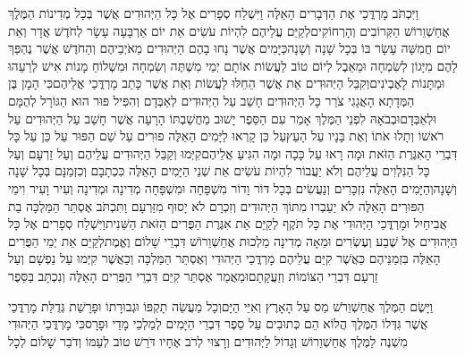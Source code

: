 \documentclass[../main/main.tex]{subfiles}
\begin{document}
\begin{multicols*}{\ncols}
וַיִּכְתֹּב מָרְדֳּכַי אֶת הַדְּבָרִים הָאֵלֶּה וַיִּשְׁלַח סְפָרִים אֶל כָּל הַיְּהוּדִים אֲשֶׁר בְּכָל מְדִינוֹת הַמֶּלֶךְ אֲחַשְׁוֵרוֹשׁ הַקְּרוֹבִים וְהָרְחוֹקִים\PreVerseSpace{}לְקַיֵּם עֲלֵיהֶם לִהְיוֹת עֹשִׂים אֵת יוֹם אַרְבָּעָה עָשָׂר לְחֹדֶשׁ אֲדָר וְאֵת יוֹם חֲמִשָּׁה עָשָׂר בּוֹ בְּכָל שָׁנָה וְשָׁנָה\PreVerseSpace{}כַּיָּמִים אֲשֶׁר נָחוּ בָהֶם הַיְּהוּדִים מֵאֹיְבֵיהֶם וְהַחֹדֶשׁ אֲשֶׁר נֶהְפַּךְ לָהֶם מִיָּגוֹן לְשִׂמְחָה וּמֵאֵבֶל לְיוֹם טוֹב לַעֲשׂוֹת אוֹתָם יְמֵי מִשְׁתֶּה וְשִׂמְחָה וּמִשְׁלוֹחַ מָנוֹת אִישׁ לְרֵעֵהוּ וּמַתָּנוֹת לָאֶבְיֹנִים\PreVerseSpace{}וְקִבֵּל הַיְּהוּדִים אֵת אֲשֶׁר הֵחֵלּוּ לַעֲשׂוֹת וְאֵת אֲשֶׁר כָּתַב מָרְדֳּכַי אֲלֵיהֶם\PreVerseSpace{}כִּי הָמָן בֶּן הַמְּדָתָא הָאֲגָגִי צֹרֵר כָּל הַיְּהוּדִים חָשַׁב עַל הַיְּהוּדִים לְאַבְּדָם וְהִפִּיל פּוּר הוּא הַגּוֹרָל לְהֻמָּם וּלְאַבְּדָם\PreVerseSpace{}וּבְבֹאָהּ לִפְנֵי הַמֶּלֶךְ אָמַר עִם הַסֵּפֶר יָשׁוּב מַחֲשַׁבְתּוֹ הָרָעָה אֲשֶׁר חָשַׁב עַל הַיְּהוּדִים עַל רֹאשׁוֹ וְתָלוּ אֹתוֹ וְאֶת בָּנָיו עַל הָעֵץ\PreVerseSpace{}עַל כֵּן קָרְאוּ לַיָּמִים הָאֵלֶּה פוּרִים עַל שֵׁם הַפּוּר עַל כֵּן עַל כָּל דִּבְרֵי הָאִגֶּרֶת הַזֹּאת וּמָה רָאוּ עַל כָּכָה וּמָה הִגִּיעַ אֲלֵיהֶם\PreVerseSpace{}קִיְּמוּ וְקַבֵּל הַיְּהוּדִים עֲלֵיהֶם וְעַל זַרְעָם וְעַל כָּל הַנִּלְוִים עֲלֵיהֶם וְלֹא יַעֲבוֹר לִהְיוֹת עֹשִׂים אֵת שְׁנֵי הַיָּמִים הָאֵלֶּה כִּכְתָבָם וְכִזְמַנָּם בְּכָל שָׁנָה וְשָׁנָה\PreVerseSpace{}וְהַיָּמִים הָאֵלֶּה נִזְכָּרִים וְנַעֲשִׂים בְּכָל דּוֹר וָדוֹר מִשְׁפָּחָה וּמִשְׁפָּחָה מְדִינָה וּמְדִינָה וְעִיר וָעִיר וִימֵי הַפּוּרִים הָאֵלֶּה לֹא יַעַבְרוּ מִתּוֹךְ הַיְּהוּדִים וְזִכְרָם לֹא יָסוּף מִזַּרְעָם \ClosedSection{}וַתִּכְתֹּב אֶסְתֵּר הַמַּלְכָּה בַת אֲבִיחַיִל וּמָרְדֳּכַי הַיְּהוּדִי אֶת כָּל תֹּקֶף לְקַיֵּם אֵת אִגֶּרֶת הַפֻּרִים הַזֹּאת הַשֵּׁנִית\PreVerseSpace{}וַיִּשְׁלַח סְפָרִים אֶל כָּל הַיְּהוּדִים אֶל שֶׁבַע וְעֶשְׂרִים וּמֵאָה מְדִינָה מַלְכוּת אֲחַשְׁוֵרוֹשׁ דִּבְרֵי שָׁלוֹם וֶאֱמֶת\PreVerseSpace{}לְקַיֵּם אֵת יְמֵי הַפֻּרִים הָאֵלֶּה בִּזְמַנֵּיהֶם כַּאֲשֶׁר קִיַּם עֲלֵיהֶם מָרְדֳּכַי הַיְּהוּדִי וְאֶסְתֵּר הַמַּלְכָּה וְכַאֲשֶׁר קִיְּמוּ עַל נַפְשָׁם וְעַל זַרְעָם דִּבְרֵי הַצּוֹמוֹת וְזַעֲקָתָם\PreVerseSpace{}וּמַאֲמַר אֶסְתֵּר קִיַּם דִּבְרֵי הַפֻּרִים הָאֵלֶּה וְנִכְתָּב בַּסֵּפֶר\OpenSection{}\par
{}וַיָּשֶׂם הַמֶּלֶךְ אֲחַשְׁוֵרֹשׁ\SubEnd{} מַס עַל הָאָרֶץ וְאִיֵּי הַיָּם\PreVerseSpace{}וְכָל מַעֲשֵׂה תָקְפּוֹ וּגְבוּרָתוֹ וּפָרָשַׁת גְּדֻלַּת מָרְדֳּכַי אֲשֶׁר גִּדְּלוֹ הַמֶּלֶךְ הֲלוֹא הֵם כְּתוּבִים עַל סֵפֶר דִּבְרֵי הַיָּמִים לְמַלְכֵי מָדַי וּפָרָס\PreVerseSpace{}כִּי מָרְדֳּכַי הַיְּהוּדִי מִשְׁנֶה לַמֶּלֶךְ אֲחַשְׁוֵרוֹשׁ וְגָדוֹל לַיְּהוּדִים וְרָצוּי לְרֹב אֶחָיו דֹּרֵשׁ טוֹב לְעַמּוֹ וְדֹבֵר שָׁלוֹם לְכָל\par
\end{multicols*}
\end{document}
